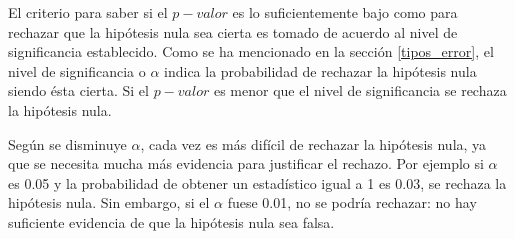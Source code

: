 El criterio para saber si el $p-valor$ es lo suficientemente bajo como para rechazar que la hipótesis nula sea cierta
es tomado de acuerdo al nivel de significancia establecido. Como se ha mencionado en la sección \ref{tipos_error}, el
nivel de significancia o $\alpha$ indica la probabilidad de rechazar la hipótesis nula siendo ésta cierta. Si el
$p-valor$ es menor que el nivel de significancia se rechaza la hipótesis nula.

Según se disminuye $\alpha$, cada vez es más difícil de rechazar la hipótesis nula, ya que se necesita mucha más
evidencia para justificar el rechazo. Por ejemplo si $\alpha$ es 0.05 y la probabilidad de obtener un estadístico
igual a 1 es 0.03, se rechaza la hipótesis nula. Sin embargo, si el $\alpha$ fuese 0.01, no se podría rechazar: no hay suficiente evidencia de que la hipótesis nula sea falsa.


